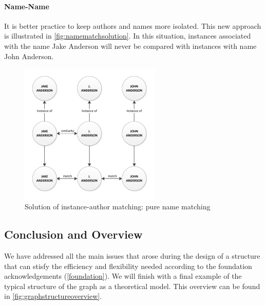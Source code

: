 \paragraph{Name-Name} It is better practice to keep authors and names more isolated. This new approach is illustrated in \autoref{fig:namematchsolution}. In this situation, instances associated with the name Jake Anderson will never be compared with instances with name John Anderson.

\begin{figure}[htb]
	\centering
		\includegraphics[width=0.6\textwidth]{fig/namematchsolution}
	\caption{Solution of instance-author matching: pure name matching}
	\label{fig:namematchsolution}
\end{figure}

\subsection{Conclusion and Overview}

We have addressed all the main issues that arose during the design of a structure that can stisfy the efficiency and flexibility needed according to the foundation acknowledgements (\autoref{foundation}). We will finish with a final example of the typical structure of the graph as a theoretical model. This overview can be found in \autoref{fig:graphstructureoverview}.

